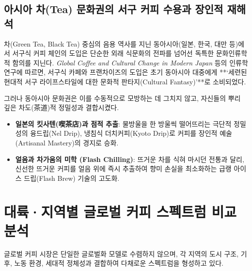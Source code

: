 \documentclass[10pt,a4paper]{article}
\begin{document}
\subsection{아시아 차(Tea) 문화권의 서구 커피 수용과 장인적 재해석}
차(Green Tea, Black Tea) 중심의 음용 역사를 지닌 동아시아(일본, 한국, 대만 등)에서 서구식 커피 체인의 도입은 단순한 외래 식문화의 전파를 넘어선 독특한 문화인류학적 함의를 지닌다.
\textit{Global Coffee and Cultural Change in Modern Japan} 등의 인류학 연구에 따르면, 서구식 카페와 프랜차이즈의 도입은 초기 동아시아 대중에게 **‘세련된 현대적 서구 라이프스타일에 대한 문화적 판타지(Cultural Fantasy)’**로 소비되었다. 

그러나 동아시아 문화권은 이를 수동적으로 모방하는 데 그치지 않고, 자신들의 뿌리 깊은 차도(茶道)적 정밀성과 결합시켰다.
\begin{itemize}[itemsep=2pt]
    \item \textbf{일본의 킷사텐(喫茶店)과 점적 추출}: 물방울을 한 방울씩 떨어뜨리는 극단적 정밀성의 융드립(Nel Drip), 냉침식 더치커피(Kyoto Drip)로 커피를 장인적 예술(Artisanal Mastery)의 경지로 승화.
    \item \textbf{얼음과 차가움의 미학 (Flash Chilling)}: 뜨거운 차를 식혀 마시던 전통과 달리, 신선한 뜨거운 커피를 얼음 위에 즉시 추출하여 향미 손실을 최소화하는 급랭 아이스 드립(Flash Brew) 기술의 고도화.
\end{itemize}

\section{대륙·지역별 글로벌 커피 스펙트럼 비교 분석}

글로벌 커피 시장은 단일한 글로벌화 모델로 수렴하지 않으며, 각 지역의 도시 구조, 기후, 노동 환경, 세대적 정체성과 결합하여 다채로운 스펙트럼을 형성하고 있다.
\end{document}
